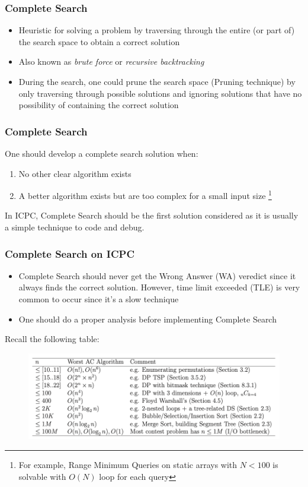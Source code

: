 \documentclass{beamer}
\begin{document}
\begin{frame}[fragile]
\frametitle{Complete Search}

\begin{itemize}
    \item Heuristic for solving a problem by traversing through the entire (or part of) the search space to obtain a correct solution
    \item Also known as \textit{brute force} or \textit{recursive backtracking}
    \item During the search, one could prune the search space (\color{blue}Pruning technique\color{black}) by only traversing through possible solutions and ignoring solutions that have no possibility of containing the correct solution
\end{itemize}

\end{frame}

\begin{frame}[fragile]
\frametitle{Complete Search}

One should develop a complete search solution when:
\begin{enumerate}
    \item No other clear algorithm exists
    \item A better algorithm exists but are too complex for a small input size \footnote{For example, Range Minimum Queries on static arrays with $N < 100$ is solvable with $O(N)$ loop for each query} 
\end{enumerate}

\vspace{1cm}

\color{blue} In ICPC, Complete Search should be the first solution considered as it is usually a simple technique to code and debug.\color{black}

\end{frame}

\begin{frame}[fragile]
\frametitle{Complete Search on ICPC}
\begin{itemize}
    \item Complete Search should never get the Wrong Answer (WA) veredict since it always finds the correct solution. However, time limit exceeded (TLE) is very common to occur since it's a slow technique
    \item One should do a proper analysis before implementing Complete Search
\end{itemize}
Recall the following table: 
\begin{figure}
    \centering
    \includegraphics[scale=0.3]{imgs/complexities_table.png}
\end{figure}
\end{frame}
\end{document}
